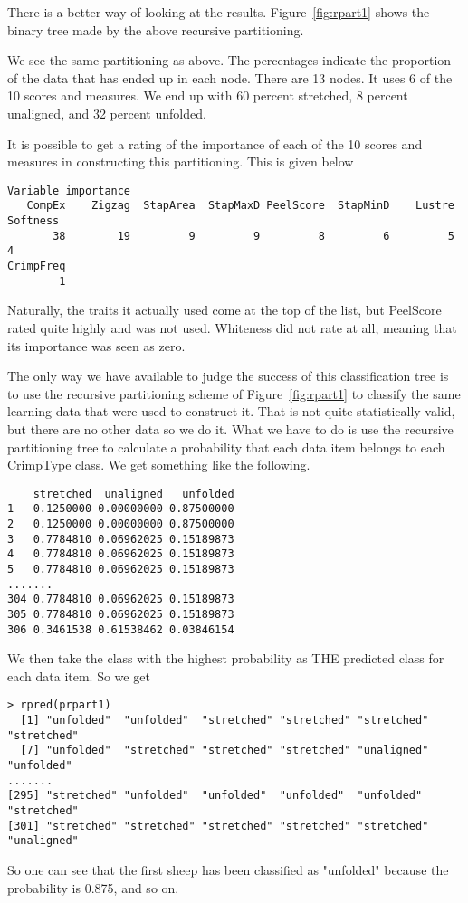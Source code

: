 \documentclass[titlepage]{article}  %
\begin{document}
	There is a better way of looking at the results. Figure~\ref{fig:rpart1} shows the binary tree made by the above recursive partitioning.

We see the same partitioning as above. The percentages indicate the proportion of the data that has ended up in each node. There are 13 nodes.  It uses 6 of the 10 scores and measures. We end up with 60 percent stretched, 8 percent unaligned, and 32 percent unfolded.

	It is  possible to get a rating of the importance of each of the 10 scores and measures in constructing this partitioning. This is given below
\begin{verbatim}
Variable importance
   CompEx    Zigzag  StapArea  StapMaxD PeelScore  StapMinD    Lustre  Softness 
       38        19         9         9         8         6         5         4 
CrimpFreq 
        1 
\end{verbatim}
  Naturally, the traits it actually used come at the top of the list, but PeelScore rated quite highly and was not used. Whiteness did not rate at all, meaning that its importance was seen as zero.

	The only way we have available to judge the success of this classification tree is to use the recursive partitioning scheme of Figure~\ref{fig:rpart1} to classify the same learning data that were used to construct it.  That is not quite statistically valid, but there are no other data so we do it.  What we have to do is use the recursive partitioning tree to calculate a probability that each data item belongs to each CrimpType class. We get something like the following.

\begin{verbatim}
    stretched  unaligned   unfolded
1   0.1250000 0.00000000 0.87500000
2   0.1250000 0.00000000 0.87500000
3   0.7784810 0.06962025 0.15189873
4   0.7784810 0.06962025 0.15189873
5   0.7784810 0.06962025 0.15189873
.......
304 0.7784810 0.06962025 0.15189873
305 0.7784810 0.06962025 0.15189873
306 0.3461538 0.61538462 0.03846154
\end{verbatim}
  We then take the class with the highest probability as THE predicted class for each data item. So we get

\begin{verbatim}
> rpred(prpart1)
  [1] "unfolded"  "unfolded"  "stretched" "stretched" "stretched" "stretched"
  [7] "unfolded"  "stretched" "stretched" "stretched" "unaligned" "unfolded" 
.......
[295] "stretched" "unfolded"  "unfolded"  "unfolded"  "unfolded"  "stretched"
[301] "stretched" "stretched" "stretched" "stretched" "stretched" "unaligned"
\end{verbatim}
So one can see that the first sheep has been classified as "unfolded" because the probability is 0.875, and so on.
\end{document}
